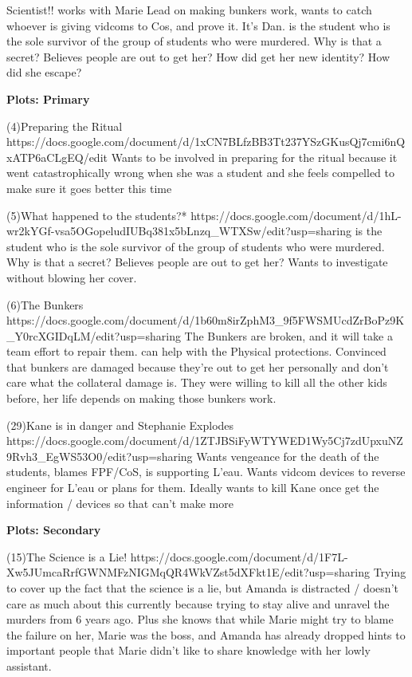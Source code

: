 \documentclass[char]{GL2020}
\begin{document}
Scientist!!
works with Marie
Lead on making bunkers work, wants to catch whoever is giving vidcoms to Cos, and prove it.  It's Dan.
\cAssistantScientist{} is the student who is the sole survivor of the group of students who were murdered.  Why is that a secret?  Believes people are out to get her?  How did \cAssistantScientist{} get her new identity?  How did she escape?

\textbf{Plots: Primary}

(4)Preparing the Ritual
https://docs.google.com/document/d/1xCN7BLfzBB3Tt237YSzGKusQj7cmi6nQxATP6aCLgEQ/edit
Wants to be involved in preparing for the ritual because it went catastrophically wrong when she was a student and she feels compelled to make sure it goes better this time

(5)What happened to the students?*
https://docs.google.com/document/d/1hL-wr2kYGf-vsa5OGopeludIUBq381x5bLnzq_WTXSw/edit?usp=sharing
\cAssistantScientist{} is the student who is the sole survivor of the group of students who were murdered.  Why is that a secret?  Believes people are out to get her?  Wants to investigate without blowing her cover.

(6)The Bunkers
https://docs.google.com/document/d/1b60m8irZphM3_9f5FWSMUcdZrBoPz9K_Y0rcXGIDqLM/edit?usp=sharing
The Bunkers are broken, and it will take a team effort to repair them.  \cAssistantScientist{} can help with the Physical protections.  Convinced that bunkers are damaged because they’re out to get her personally and don’t care what the collateral damage is.  They were willing to kill all the other kids before, her life depends on making those bunkers work.

(29)Kane is in danger and Stephanie Explodes
https://docs.google.com/document/d/1ZTJBSiFyWTYWED1Wy5Cj7zdUpxuNZ9Rvh3_EgWS53O0/edit?usp=sharing
Wants vengeance for the death of the students, blames FPF/CoS, is supporting L'eau.  Wants vidcom devices to reverse engineer for L'eau or plans for them.  Ideally wants to kill Kane once get the information / devices so that can't make more

\textbf{Plots: Secondary}

(15)The Science is a Lie!
https://docs.google.com/document/d/1F7L-Xw5JUmcaRrfGWNMFzNIGMqQR4WkVZst5dXFkt1E/edit?usp=sharing
Trying to cover up the fact that the science is a lie, but Amanda is distracted / doesn't care as much about this currently because trying to stay alive and unravel the murders from 6 years ago. Plus she knows that while Marie might try to blame the failure on her, Marie was the boss, and Amanda has already dropped hints to important people that Marie didn’t like to share knowledge with her lowly assistant. 
\end{document}

